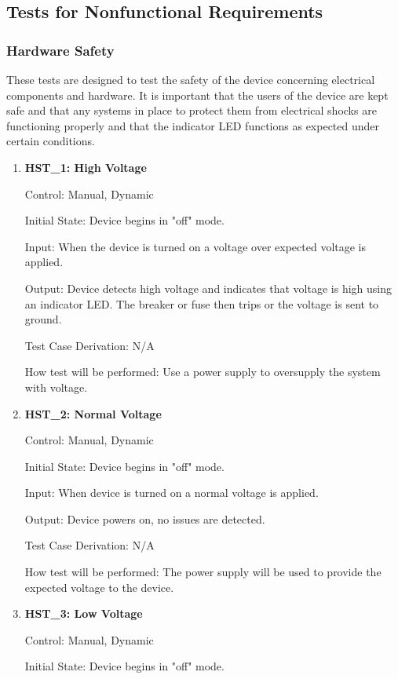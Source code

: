 \documentclass[12pt, titlepage]{article}
\begin{document}
\subsection{Tests for Nonfunctional Requirements}
\subsubsection{Hardware Safety }

These tests are designed to test the safety of the device concerning electrical components and hardware. It is important that the users of the device are kept safe and that any systems in place to protect them from electrical shocks are functioning properly and that the indicator LED functions as expected under certain conditions.

\begin{enumerate}

\item{\textbf{HST\_1: High Voltage}}\label{HST1}

Control: Manual, Dynamic

Initial State: Device begins in "off" mode.

Input: When the device is turned on a voltage over expected voltage is applied.

Output: Device detects high voltage and indicates that voltage is high using an indicator LED. The breaker or fuse then trips or the voltage is sent to ground.

Test Case Derivation: N/A

How test will be performed: Use a power supply to oversupply the system with voltage. 

\item{\textbf{HST\_2: Normal Voltage}}\label{HST2}

Control: Manual, Dynamic

Initial State: Device begins in "off" mode.

Input: When device is turned on a normal voltage is applied.

Output: Device powers on, no issues are detected.

Test Case Derivation: N/A

How test will be performed: The power supply will be used to provide the expected voltage to the device.

\item{\textbf{HST\_3: Low Voltage}}\label{HST3}

Control: Manual, Dynamic

Initial State: Device begins in "off" mode.


\end{enumerate}
\end{document}
